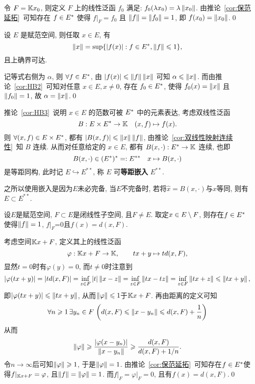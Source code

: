     \begin{Proof}
        令 $ F=\mathbb{K} x_{0} $, 则定义 $ F $ 上的线性泛函 $ f_{0} $ 满足: $ f_{0}(\lambda x_{0})=\lambda\left\| x_{0} \right\| $. 由推论~\ref{cor:保范延拓}~可知存在 $ f\in E^{*} $ 使得 $ f|_{F}=f_{0} $ 且 $ \left\| f \right\|=\left\| f_{0} \right\|=1 $, 即 $ f(x_{0})=\left\| x_{0} \right\| $.\qed
    \end{Proof}
    \begin{Corollary}\label{cor:HB3}
        设 $ E $ 是赋范空间, 则任取 $ x\in E $, 有
        \[
            \left\| x \right\|=\sup\{ \left| f(x) \right| :f\in E^{*}, \left\| f \right\|\leqslant1 \},
        \]
        且上确界可达.
    \end{Corollary}
    \begin{Proof}
        记等式右侧为 $ \alpha $, 则 $ \forall f\in E^{*} $, 由 $ \left| f(x) \right| \leqslant\left\| f \right\|\left\| x \right\| $ 可知 $ \alpha \leqslant\left\| x \right\| $. 而由推论~\ref{cor:HB2}~可知对任意 $ x\in E, x\ne 0 $, 存在 $ f_{0}\in E^{*} $, 使得 $ f_{0}(x)=\left\| x \right\| $ 且 $ \left\| f_{0} \right\|=1 $, 故 $ \alpha =\left\| x \right\| $.\qed
    \end{Proof}
    推论~\ref{cor:HB3}~说明 $ x\in E $ 的范数可被 $ E^{*} $ 中的元素表达, 考虑双线性泛函
    \[
        B:E\times E^{*}\to\mathbb{K}\quad(x, f)\mapsto f(x).
    \]
    则 $ \forall(x, f)\in E\times E^{*} $, 都有 $ \left| B(x, f) \right| \leqslant\left\| x \right\|\left\| f \right\| $, 由推论~\ref{cor:双线性映射连续性}~知 $ B $ 连续. 从而对任意给定的 $ x\in E $, 都有 $ B(x, \cdot):E^{*}\to\mathbb{K} $ 连续, 也即
    \[
        B(x,\cdot)\in(E^{*})^{*}=: E^{**}\quad x\mapsto B(x, \cdot)
    \]
    是等距同构, 此时记 $ E\hookrightarrow E^{**} $, 称 $ E $ 可\textbf{等距嵌入} $ E^{**} $.

    之所以使用嵌入是因为$ E $未必完备, 当$ E $不完备时, 若将$ \hat{x}=B(x,\cdot) $与$ x $等同, 则有$ E\subset E^{**} $.

    \begin{Corollary}\label{cor:HB4}
    设$ E $是赋范空间, $ F\subset E $是闭线性子空间, 且$ F\ne E $. 取定$ x\in E\setminus F $, 则存在$ f\in E^{*} $使得$ \left\| f \right\|=1 $, $ f\rvert_F $=0且$ f(x)=d(x,F) $.
    \end{Corollary}
    \begin{Proof}
    考虑空间$ \mathbb{K} x+F $, 定义其上的线性泛函
    \[
    \varphi : \mathbb{K} x+F\to\mathbb{K},\qquad tx+y\mapsto td(x,F),
    \]
    显然$ t=0 $时有$ \varphi(y)=0 $, 而$ t\ne 0 $时注意到
    \[
    \left| \varphi(tx+y) \right| =\left| td(x,F) \right| =\inf_{z\in F}\left| t \right| \left\| x-z \right\|=\inf_{z\in F}\left\| tx-tz \right\|=\inf_{z\in F}\left\| tx+z \right\|\leqslant\left\| tx+y \right\|,
    \]
    即$ \left| \varphi(tx+y) \right| \leqslant\left\| tx+y \right\| $, 从而$ \left\| \varphi \right\|\leqslant 1 $于$ \mathbb{K} x+F $. 再由距离的定义可知
    \[
    \forall n\geqslant 1\,\exists y_n\in F\,\left(d(x,F)\leqslant\left\| x-y_n \right\|\leqslant d(x,F)+\frac{1}{n}\right)
    \]
    从而
    \[
    \left\| \varphi \right\|\geqslant\frac{\left| \varphi(x-y_n) \right| }{\left\| x-y_n \right\|}\geqslant\frac{d(x,F)}{d(x,F)+1/n}.
    \]
    令$ n\to\infty $后可知$ \left\| \varphi \right\|\geqslant 1 $, 于是$ \left\| \varphi \right\|=1 $. 由推论~\ref{cor:保范延拓}~可知存在$ f\in E^{*} $使得$ f\rvert_{\mathbb{K} x+F}=\varphi $, 且$ \left\| f \right\|=\left\| \varphi \right\|=1 $. 而$ f\rvert_F=\varphi\rvert_F=0 $, 且有$ f(x)=d(x,F) $.\qed
    \end{Proof}

